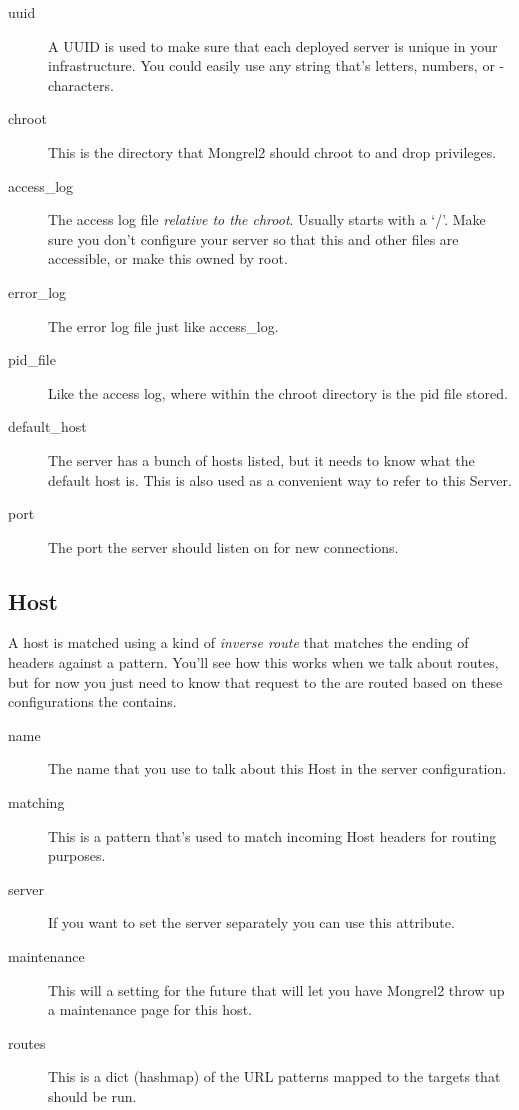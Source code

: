 \begin{description}
\item[uuid] A UUID is used to make sure that each deployed server is unique in your infrastructure.
    You could easily use any string that's letters, numbers, or - characters.
\item[chroot] This is the directory that Mongrel2 should chroot to and drop privileges.
\item[access\_log] The access log file \emph{relative to the chroot}.  Usually starts with a `/'.  Make sure
    you don't configure your server so that this and other files are accessible, or make this owned by root.
\item[error\_log] The error log file just like access\_log.
\item[pid\_file] Like the access log, where within the chroot directory is the pid file stored.
\item[default\_host] The server has a bunch of hosts listed, but it needs to know what the default host is.  This is also
    used as a convenient way to refer to this Server.
\item[port] The port the server should listen on for new connections.
\end{description}


\subsection{Host}

A host is matched using a kind of \emph{inverse route} that matches the ending of 
headers against a pattern.  You'll see how this works when we talk about routes, but for now
you just need to know that request to the  are routed based on these 
configurations the  contains.

\begin{description}
\item[name] The name that you use to talk about this Host in the server configuration.
\item[matching] This is a pattern that's used to match incoming Host headers for routing purposes.
\item[server] If you want to set the server separately you can use this attribute.
\item[maintenance] This will a setting for the future that will let you have Mongrel2 throw up a maintenance page
    for this host.
\item[routes] This is a dict (hashmap) of the URL patterns mapped to the targets that should be run.
\end{description}


